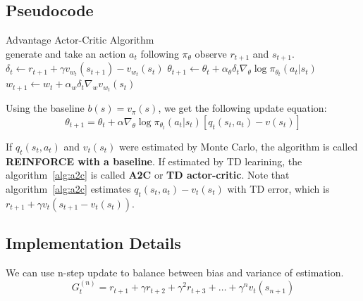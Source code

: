     \subsection{Pseudocode}
        {Advantage Actor-Critic Algorithm}
        {
             \\
        }
        {
        }
        {
             {
                generate and take an action $a_t$ following $\pi_\theta$\;
                observe $r_{t+1}$ and $s_{t+1}$.\;
                $\delta_t \leftarrow r_{t+1} + \gamma v_{w_t}(s_{t+1}) - v_{w_t}(s_t)$\;
                $\theta_{t + 1} \leftarrow \theta_t + \alpha_\theta \delta_t \nabla_\theta \log{\pi_{\theta_t}(a_t|s_t)}$\;
                $w_{t+1} \leftarrow w_t + \alpha_w \delta_t \nabla_w v_{w_t}(s_t)$\; 
            }
            \Return{$\pi$}
        }
        
        Using the baseline $b(s) = v_\pi(s)$, we get the following update equation:
        \begin{equation}
            \theta_{t+1} = \theta_t + \alpha \nabla_\theta \log{\pi_{\theta_t}(a_t|s_t)}[q_t(s_t,a_t) - v(s_t)]
        \end{equation}

        If $q_t(s_t,a_t)$ and $v_t(s_t)$ were estimated by Monte Carlo, the algorithm is called \textbf{REINFORCE with a baseline}.
        If estimated by TD learining, the algorithm~\ref{alg:a2c} is called \textbf{A2C} or \textbf{TD actor-critic}.
        Note that algorithm~\ref{alg:a2c} estimates $q_t(s_t,a_t) - v_t(s_t)$ with TD error, which is $r_{t+1} + \gamma v_t(s_{t+1} - v_t(s_t))$.
    
    \subsection{Implementation Details}
        We can use n-step update to balance between bias and variance of estimation.
        \begin{equation}
            G_t^{(n)} = r_{t + 1} + \gamma r_{t+2} + \gamma^2 r_{t+3} + \dots + \gamma^n v_t(s_{n+1})
        \end{equation}

